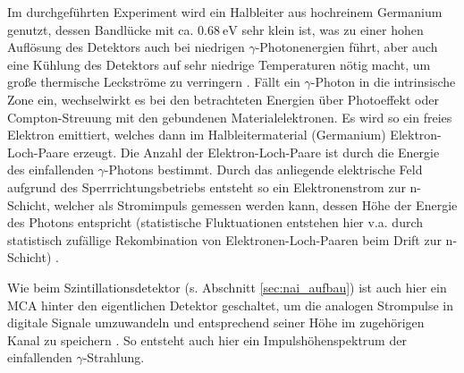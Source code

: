 Im durchgeführten Experiment wird ein Halbleiter aus hochreinem Germanium genutzt, dessen Bandlücke mit ca. $\SI{0.68}{\eV}$ sehr klein ist, was zu einer hohen Auflösung des Detektors auch bei niedrigen $\gamma$-Photonenergien führt, aber auch eine Kühlung des Detektors auf sehr niedrige Temperaturen nötig macht, um große thermische Leckströme zu verringern \cite[476-478]{semiconductorhandbook}.
Fällt ein $\gamma$-Photon in die intrinsische Zone ein, wechselwirkt es bei den betrachteten Energien über Photoeffekt oder Compton-Streuung mit den gebundenen Materialelektronen. Es wird so ein freies Elektron emittiert, welches dann im Halbleitermaterial (Germanium) Elektron-Loch-Paare erzeugt. Die Anzahl der Elektron-Loch-Paare ist durch die Energie des einfallenden $\gamma$-Photons bestimmt. Durch das anliegende elektrische Feld aufgrund des Sperrrichtungsbetriebs entsteht so ein Elektronenstrom zur n-Schicht, welcher als Stromimpuls gemessen werden kann, dessen Höhe der Energie des Photons entspricht (statistische Fluktuationen entstehen hier v.a. durch statistisch zufällige Rekombination von Elektronen-Loch-Paaren beim Drift zur n-Schicht) \cite[421-422]{kolanoskiwermerdetektoren}.

Wie beim Szintillationsdetektor (s. Abschnitt \ref{sec:nai_aufbau}) ist auch hier ein MCA hinter den eigentlichen Detektor geschaltet, um die analogen Strompulse in digitale Signale umzuwandeln und entsprechend seiner Höhe im zugehörigen Kanal zu speichern \cite[4-5]{521versuchsanleitung}. So entsteht auch hier ein Impulshöhenspektrum der einfallenden $\gamma$-Strahlung.
